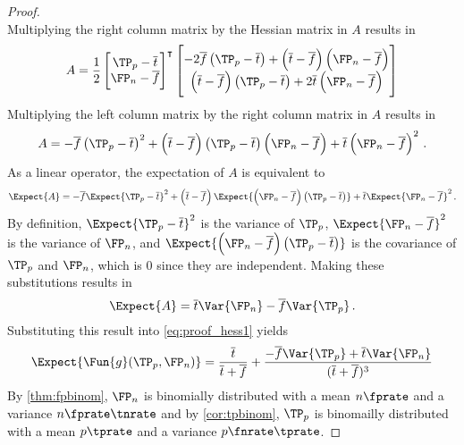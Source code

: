 \documentclass[ ../main.tex]{subfiles}
\begin{document}
{\begin{proof}
\begin{equation}
\end{equation}
Multiplying the right column matrix by the Hessian matrix in $A$ results in
\begin{equation}
    A = \frac{1}{2}
    \begin{bmatrix}
        \TP_p - \overline{t}\\
        \FP_n - \overline{f}
    \end{bmatrix}^{\intercal}
    \begin{bmatrix}
        -2 \overline{f} \left(\TP_p - \overline{t}\right) + \left(\overline{t}-\overline{f}\right)\left(\FP_n - \overline{f}\right)\\
        \left(\overline{t}-\overline{f}\right)\left(\TP_p - \overline{t}\right) + 2 \overline{t}\left(\FP_n - \overline{f}\right)
    \end{bmatrix}
\end{equation}
Multiplying the left column matrix by the right column matrix in $A$ results in
\begin{equation}
    A = -\overline{f} \left(\TP_p - \overline{t}\right)^2 + 
    \left(\overline{t}-\overline{f}\right)\left(\TP_p - 
    \overline{t}\right)\left(\FP_n - \overline{f}\right) + 
    \overline{t}\left(\FP_n - \overline{f}\right)^2\,.
\end{equation}
As a linear operator, the expectation of $A$ is equivalent to
\begin{equation}
\label{eq:proof_of_exp_precision_approx_1}
    \Expect{A} = -\overline{f} \Expect{\TP_p - \overline{t}}^2 + \left(\overline{t}-\overline{f}\right)\Expect{\left(\FP_n - \overline{f}\right)\left(\TP_p - \overline{t}\right)} + \overline{t}\Expect{\FP_n - \overline{f}}^2\,.
\end{equation}
By definition, $\Expect{\TP_p - \overline{t}}^2$ is the variance of $\TP_p$, $\Expect{\FP_n - \overline{f}}^2$ is the variance of $\FP_n$, and $\Expect{\left(\FP_n - \overline{f}\right)\left(\TP_p - \overline{t}\right)}$ is the covariance of $\TP_p$ and $\FP_n$, which is $0$ since they are independent.
Making these substitutions results in
\begin{equation}
    \Expect{A} = \overline{t} \Var{\FP_n} - \overline{f} \Var{\TP_p}\,.
\end{equation}
Substituting this result into \cref{eq:proof_hess1} yields
\begin{equation}
\label{eq:proof_hess2}
    \Expect{\Fun{g}(\TP_p,\FP_n)} = 
    \frac{\overline{t}}{\overline{t}+\overline{f}} + 
    \frac{-\overline{f} \Var{\TP_p} + 
    \overline{t}\Var{\FP_n}}{(\overline{t} + \overline{f})^3}
\end{equation}
By \cref{thm:fpbinom}, $\FP_n$ is binomially distributed with a mean $n \fprate$ and a variance $n \fprate \tnrate$ and by \cref{cor:tpbinom}, $\TP_p$ is binomailly distributed with a mean $p \tprate$ and a variance $p \fnrate \tprate$.
\end{proof}

}
\end{document}
